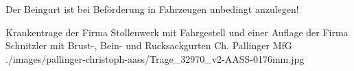 \begin{Synopsis}
\end{Synopsis}
\begin{Danger}
  \item Der Beingurt ist bei Beförderung in Fahrzeugen unbedingt anzulegen!
\end{Danger}
% 
% 



\PictureWide
{Krankentrage der Firma Stollenwerk{\texttrademark} mit
Fahrgestell und einer Auflage der Firma
Schnitzler{\texttrademark} mit Brust-, Bein- und
Rucksackgurten}%
{}%
{}%
{Ch. Pallinger}%
{MfG}%
{./images/pallinger-christoph-aass/Trage_32970_v2-AASS-0176mm.jpg}%
{}%
{}%








